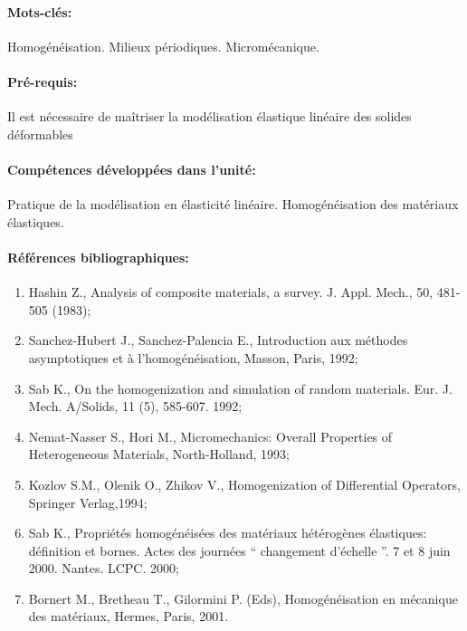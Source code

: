 \paragraph{Mots-clés:} 

Homogénéisation. Milieux périodiques. Micromécanique.



\paragraph{Pré-requis: }

Il est nécessaire de maîtriser la modélisation élastique linéaire des solides déformables

\paragraph{Compétences développées dans l’unité:}
Pratique de la modélisation en élasticité linéaire. Homogénéisation des matériaux élastiques.


\paragraph{Références bibliographiques:}
\begin{enumerate}
\item Hashin Z., Analysis of composite materials, a survey. J. Appl. Mech., 50, 481-505 (1983); 
\item Sanchez-Hubert J., Sanchez-Palencia E., Introduction aux méthodes asymptotiques et à l’homogénéisation, Masson, Paris, 1992; 
\item Sab K., On the homogenization and simulation of random materials. Eur. J. Mech. A/Solids, 11 (5), 585-607. 1992; 
\item Nemat-Nasser S., Hori M., Micromechanics: Overall Properties of Heterogeneous Materials, North-Holland, 1993; 
\item Kozlov S.M., Olenik O., Zhikov V., Homogenization of Differential Operators, Springer Verlag,1994; 
\item Sab K., Propriétés homogénéisées des matériaux hétérogènes élastiques: définition et bornes. Actes des journées “ changement d’échelle ”. 7 et 8 juin 2000. Nantes. LCPC. 2000;
\item 
Bornert M., Bretheau T., Gilormini P. (Eds), Homogénéisation en mécanique des matériaux, Hermes, Paris, 2001.
\end{enumerate}